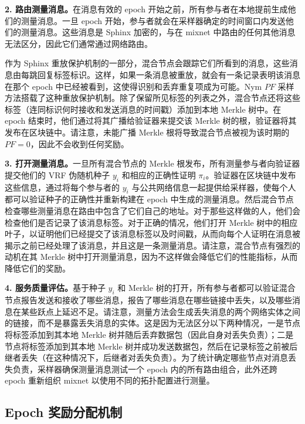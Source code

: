 \documentclass{article}
\begin{document}
	\textbf{2. 路由测量消息。}在消息有效的 epoch 开始之前，所有参与者在本地提前生成他们的测量消息。一旦 epoch 开始，参与者就会在采样器确定的时间窗口内发送他们的测量消息。这些消息是 Sphinx 加密的，与在 mixnet 中路由的任何其他消息无法区分，因此它们通常通过网络路由。\newline

	作为 Sphinx 重放保护机制的一部分，混合节点会跟踪它们所看到的消息，这些消息由每跳回复标签标识。这样，如果一条消息被重放，就会有一条记录表明该消息在那个 epoch 中已经被看到，这使得识别和丢弃重复项成为可能。Nym $PF$ 采样方法搭载了这种重放保护机制。除了保留所见标签的列表之外，混合节点还将这些标签（连同标识何时接收和发送消息的时间戳）添加到本地 Merkle 树中。在 epoch 结束时，他们通过将其广播给验证器来提交该 Merkle 树的根，验证器将其发布在区块链中。请注意，未能广播 Merkle 根将导致混合节点被视为该时期的 $PF = 0$，因此不会收到任何奖励。\newline

	\textbf{3. 打开测量消息。}一旦所有混合节点的 Merkle 根发布，所有测量参与者向验证器提交他们的 VRF 伪随机种子 $y_{i}$ 和相应的正确性证明 $\pi_{i}$。验证器在区块链中发布这些信息，通过将每个参与者的 $y_{i}$ 与公共网络信息一起提供给采样器，使每个人都可以验证种子的正确性并重新构建在 epoch 中生成的测量消息。然后混合节点检查哪些测量消息在路由中包含了它们自己的地址。对于那些这样做的人，他们会检查他们是否记录了该消息标签。对于正确的情况，他们打开 Merkle 树中的相应叶子，以证明他们已经提交了该消息标签以及时间戳，从而向每个人证明在消息被揭示之前已经处理了该消息，并且这是一条测量消息。请注意，混合节点有强烈的动机在其 Merkle 树中打开测量消息，因为不这样做会降低它们的性能指标，从而降低它们的奖励。\newline

	\textbf{4. 服务质量评估。}基于种子 $y_{i}$ 和 Merkle 树的打开，所有参与者都可以验证混合节点报告发送和接收了哪些消息，报告了哪些消息在哪些链接中丢失，以及哪些消息在某些跃点上延迟不足。请注意，测量方法会生成丢失消息的两个网络实体之间的链接，而不是暴露丢失消息的实体。这是因为无法区分以下两种情况，一是节点将标签添加到其本地 Merkle 树并随后丢弃数据包（因此自身对丢失负责）；二是节点将标签添加到其本地 Merkle 树并成功发送数据包，然后在记录标签之前被后继者丢失（在这种情况下，后继者对丢失负责）。为了统计确定哪些节点对消息丢失负责，采样器确保测量消息测试一个 epoch 内的所有路由组合，此外还跨 epoch 重新组织 mixnet 以使用不同的拓扑配置进行测量。\newline

	\subsection{Epoch 奖励分配机制}
\end{document}
